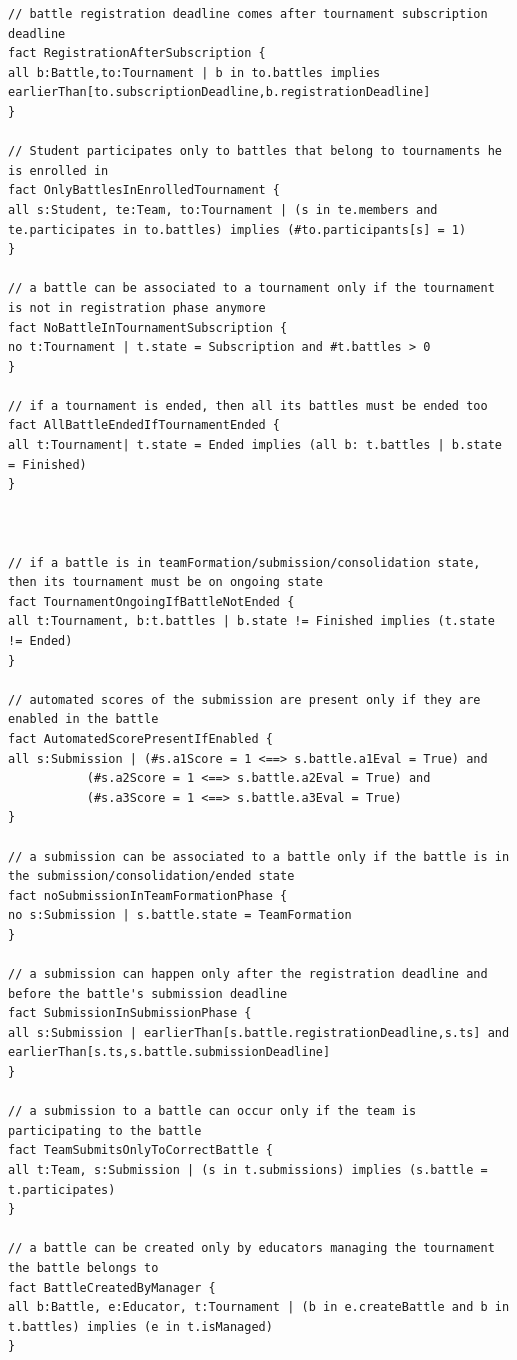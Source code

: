 \begin{lstlisting}[language=alloy]
// battle registration deadline comes after tournament subscription deadline
fact RegistrationAfterSubscription {
all b:Battle,to:Tournament | b in to.battles implies earlierThan[to.subscriptionDeadline,b.registrationDeadline]
}

// Student participates only to battles that belong to tournaments he is enrolled in
fact OnlyBattlesInEnrolledTournament {
all s:Student, te:Team, to:Tournament | (s in te.members and te.participates in to.battles) implies (#to.participants[s] = 1)
}

// a battle can be associated to a tournament only if the tournament is not in registration phase anymore
fact NoBattleInTournamentSubscription {
no t:Tournament | t.state = Subscription and #t.battles > 0
}

// if a tournament is ended, then all its battles must be ended too
fact AllBattleEndedIfTournamentEnded {
all t:Tournament| t.state = Ended implies (all b: t.battles | b.state = Finished)
}



// if a battle is in teamFormation/submission/consolidation state, then its tournament must be on ongoing state
fact TournamentOngoingIfBattleNotEnded {
all t:Tournament, b:t.battles | b.state != Finished implies (t.state != Ended)
}

// automated scores of the submission are present only if they are enabled in the battle
fact AutomatedScorePresentIfEnabled {
all s:Submission | (#s.a1Score = 1 <==> s.battle.a1Eval = True) and
		   (#s.a2Score = 1 <==> s.battle.a2Eval = True) and
		   (#s.a3Score = 1 <==> s.battle.a3Eval = True) 
}

// a submission can be associated to a battle only if the battle is in the submission/consolidation/ended state 
fact noSubmissionInTeamFormationPhase {
no s:Submission | s.battle.state = TeamFormation
}

// a submission can happen only after the registration deadline and before the battle's submission deadline
fact SubmissionInSubmissionPhase {
all s:Submission | earlierThan[s.battle.registrationDeadline,s.ts] and earlierThan[s.ts,s.battle.submissionDeadline]
}

// a submission to a battle can occur only if the team is participating to the battle
fact TeamSubmitsOnlyToCorrectBattle {
all t:Team, s:Submission | (s in t.submissions) implies (s.battle = t.participates)
}

// a battle can be created only by educators managing the tournament the battle belongs to
fact BattleCreatedByManager {
all b:Battle, e:Educator, t:Tournament | (b in e.createBattle and b in t.battles) implies (e in t.isManaged)
}


\end{lstlisting}

